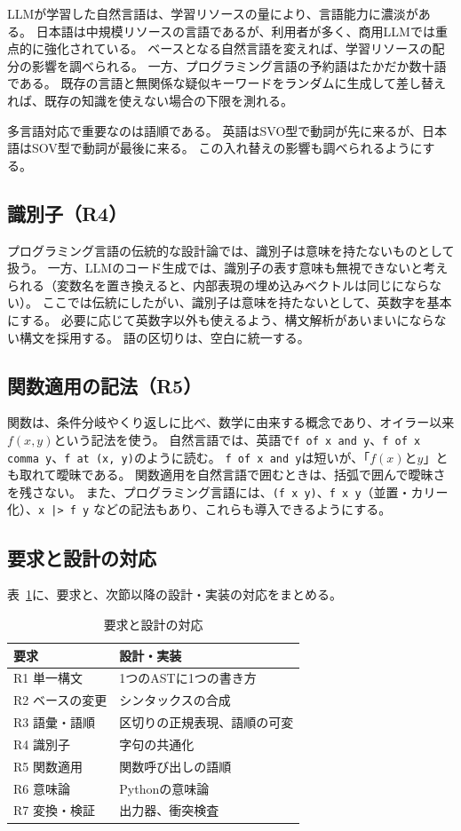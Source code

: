 \documentclass{ipsjprosym}
\begin{document}
LLMが学習した自然言語は、学習リソースの量により、言語能力に濃淡がある。
日本語は中規模リソースの言語であるが、利用者が多く、商用LLMでは重点的に強化されている。
ベースとなる自然言語を変えれば、学習リソースの配分の影響を調べられる。
一方、プログラミング言語の予約語はたかだか数十語である。
既存の言語と無関係な疑似キーワードをランダムに生成して差し替えれば、既存の知識を使えない場合の下限を測れる。

多言語対応で重要なのは語順である。
英語はSVO型で動詞が先に来るが、日本語はSOV型で動詞が最後に来る。
この入れ替えの影響も調べられるようにする。

\subsection{識別子（R4）}

プログラミング言語の伝統的な設計論では、識別子は意味を持たないものとして扱う。
一方、LLMのコード生成では、識別子の表す意味も無視できないと考えられる（変数名を置き換えると、内部表現の埋め込みベクトルは同じにならない）。
ここでは伝統にしたがい、識別子は意味を持たないとして、英数字を基本にする。
必要に応じて英数字以外も使えるよう、構文解析があいまいにならない構文を採用する。
語の区切りは、空白に統一する。

\subsection{関数適用の記法（R5）}

関数は、条件分岐やくり返しに比べ、数学に由来する概念であり、オイラー以来$f(x, y)$という記法を使う。
自然言語では、英語で\verb|f of x and y|、\verb|f of x comma y|、\verb|f at (x, y)|のように読む。
\verb|f of x and y|は短いが、「$f(x)$と$y$」とも取れて曖昧である。
関数適用を自然言語で囲むときは、括弧で囲んで曖昧さを残さない。
また、プログラミング言語には、\verb|(f x y)|、\verb|f x y|（並置・カリー化）、\verb#x |> f y# などの記法もあり、これらも導入できるようにする。

\subsection{要求と設計の対応}

表~\ref{tab:req}に、要求と、次節以降の設計・実装の対応をまとめる。

\begin{table}[t]
\centering
\caption{要求と設計の対応}
\label{tab:req}
\begin{tabular}{ll}
\hline
要求 & 設計・実装 \\
\hline
R1 単一構文     & 1つのASTに1つの書き方 \\
R2 ベースの変更 & シンタックスの合成 \\
R3 語彙・語順   & 区切りの正規表現、語順の可変 \\
R4 識別子       & 字句の共通化 \\
R5 関数適用     & 関数呼び出しの語順 \\
R6 意味論       & Pythonの意味論 \\
R7 変換・検証   & 出力器、衝突検査 \\
\hline
\end{tabular}
\end{table}
\end{document}
